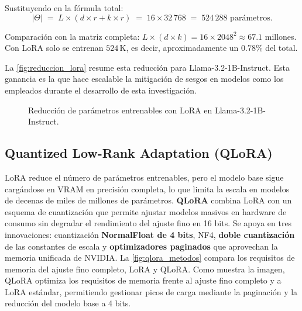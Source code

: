 \documentclass[12pt,a4paper]{report}
\begin{document}
Sustituyendo en la fórmula total:
\begin{equation*}
|\Theta| \;=\; L \times (d \times r + k \times r) \;=\; 16 \times 32\,768 \;=\; 524\,288 \text{ parámetros.}
\end{equation*}

Comparación con la matriz completa: $L \times (d \times k) = 16 \times 2048^2 \approx 67.1$ millones. Con LoRA solo se entrenan $524\,\text{K}$, es decir, aproximadamente un $0.78\%$ del total.

La \autoref{fig:reduccion_lora} resume esta reducción para Llama-3.2-1B-Instruct. Esta ganancia es la que hace escalable 
la mitigación de sesgos en modelos como los empleados durante el desarrollo de esta investigación.

\begin{figure}[H]
    \centering
    \caption{Reducción de parámetros entrenables con LoRA en Llama-3.2-1B-Instruct.}
    \label{fig:reduccion_lora}
\end{figure}

\subsection{Quantized Low-Rank Adaptation (QLoRA)}
\label{subsec:qlora}

LoRA reduce el número de parámetros entrenables, pero el modelo base sigue cargándose en VRAM en precisión completa, lo que limita la escala en modelos de decenas de miles de millones de parámetros. \textbf{QLoRA} \cite{dettmers_qlora_2023} combina LoRA con un esquema de cuantización que permite ajustar modelos masivos en hardware de consumo sin degradar el rendimiento del ajuste fino en 16 bits. Se apoya en tres innovaciones: cuantización \textbf{NormalFloat de 4 bits}, NF4, \textbf{doble cuantización} de las constantes de escala y \textbf{optimizadores paginados} que aprovechan la memoria unificada de NVIDIA. La \autoref{fig:qlora_metodos} compara los requisitos de memoria del ajuste fino completo, LoRA y QLoRA. 
Como muestra la imagen, QLoRA optimiza los requisitos de memoria frente al ajuste fino completo y a LoRA estándar, permitiendo gestionar picos de carga mediante la paginación y la reducción del modelo base a 4 bits. 
\end{document}
